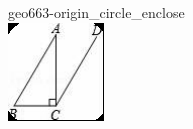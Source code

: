 \documentclass[12pt]{article}
\begin{document}
\begin{center}
\begin{minipage}{0.32\textwidth}
\end{minipage}
\hfill\begin{minipage}{0.32\textwidth}\centering
geo663-origin\_circle\_enclose\\
\includegraphics[width=0.95\linewidth]{out_rommath_origin/items/geo663-origin/assets/figure_circle.png}
\end{minipage}
\par
\end{center}
\bigskip
\end{document}
